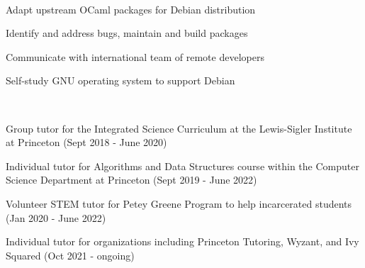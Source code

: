 \documentclass[a4paper]{MagicalCV}
\begin{document}
\begin{minipage}[t]{0.66\textwidth} 



 \\
\vspace{\topsep} %
\begin{tightemize}
\item Adapt upstream OCaml packages for Debian distribution
\item Identify and address bugs, maintain and build packages
\item Communicate with international team of remote developers
\item Self-study GNU operating system to support Debian
\end{tightemize}
\sectionsep

 \\
\vspace{\topsep} %
\begin{tightemize}
\item Group tutor for the Integrated Science Curriculum at the Lewis-Sigler Institute at Princeton (Sept 2018 - June 2020)
\item Individual tutor for Algorithms and Data Structures course within the Computer Science Department at Princeton (Sept 2019 - June 2022)
\item Volunteer STEM tutor for Petey Greene Program to help incarcerated students (Jan 2020 - June 2022)
\item Individual tutor for organizations including Princeton Tutoring, Wyzant, and Ivy Squared (Oct 2021 - ongoing)
\end{tightemize}
\sectionsep


\end{minipage}
\end{document}
